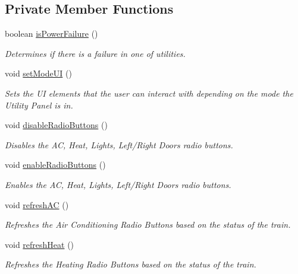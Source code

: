 \subsection*{Private Member Functions}
\begin{DoxyCompactItemize}
\item 
boolean \hyperlink{classTrainControllerComps_1_1TCUtilityPanel_acaca09d08ce4e54af81dc86ab2c768d5}{is\+Power\+Failure} ()
\begin{DoxyCompactList}\small\item\em Determines if there is a failure in one of utilities. \end{DoxyCompactList}\item 
void \hyperlink{classTrainControllerComps_1_1TCUtilityPanel_a404cb0d28b20be30802d78de9e83a831}{set\+Mode\+UI} ()
\begin{DoxyCompactList}\small\item\em Sets the UI elements that the user can interact with depending on the mode the Utility Panel is in. \end{DoxyCompactList}\item 
void \hyperlink{classTrainControllerComps_1_1TCUtilityPanel_a091dbeb6c0141d636465138a2d535613}{disable\+Radio\+Buttons} ()
\begin{DoxyCompactList}\small\item\em Disables the AC, Heat, Lights, Left/\+Right Doors radio buttons. \end{DoxyCompactList}\item 
void \hyperlink{classTrainControllerComps_1_1TCUtilityPanel_ae698554e95819802e78e7159d7319d98}{enable\+Radio\+Buttons} ()
\begin{DoxyCompactList}\small\item\em Enables the AC, Heat, Lights, Left/\+Right Doors radio buttons. \end{DoxyCompactList}\item 
void \hyperlink{classTrainControllerComps_1_1TCUtilityPanel_a0f0e32861d6be9a11dba70ce291c068d}{refresh\+AC} ()
\begin{DoxyCompactList}\small\item\em Refreshes the Air Conditioning Radio Buttons based on the status of the train. \end{DoxyCompactList}\item 
void \hyperlink{classTrainControllerComps_1_1TCUtilityPanel_a58e2492e881e7a093f62b54c2023df28}{refresh\+Heat} ()
\begin{DoxyCompactList}\small\item\em Refreshes the Heating Radio Buttons based on the status of the train. \end{DoxyCompactList}\item 

\end{DoxyCompactItemize}
